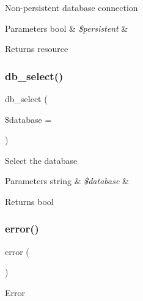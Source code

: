 Non-\/persistent database connection


\begin{DoxyParams}[1]{Parameters}
bool & {\em \$persistent} & \\
\hline
\end{DoxyParams}
\begin{DoxyReturn}{Returns}
resource 
\end{DoxyReturn}
\mbox{\label{class_c_i___d_b__mssql__driver_a18ae9c21870b30b45337c5e3626190cc}} 
\subsubsection{\texorpdfstring{db\+\_\+select()}{db\_select()}}
{\footnotesize\ttfamily db\+\_\+select (\begin{DoxyParamCaption}\item[{}]{\$database = {\ttfamily \textquotesingle{}\textquotesingle{}} }\end{DoxyParamCaption})}

Select the database


\begin{DoxyParams}[1]{Parameters}
string & {\em \$database} & \\
\hline
\end{DoxyParams}
\begin{DoxyReturn}{Returns}
bool 
\end{DoxyReturn}
\mbox{\label{class_c_i___d_b__mssql__driver_a43b8d30b879d4f09ceb059b02af2bc02}} 
\subsubsection{\texorpdfstring{error()}{error()}}
{\footnotesize\ttfamily error (\begin{DoxyParamCaption}{ }\end{DoxyParamCaption})}

Error


